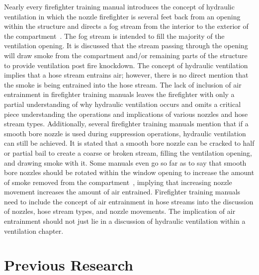 \documentclass[12pt,oneside]{book}
\begin{document}
Nearly every firefighter training manual introduces the concept of hydraulic ventilation in which the nozzle firefighter is several feet back from an opening within the structure and directs a fog stream from the interior to the exterior of the compartment~\cite{Essentials6,FEHandbook}. The fog stream is intended to fill the majority of the ventilation opening. It is discussed that the stream passing through the opening will draw smoke from the compartment and/or remaining parts of the structure to provide ventilation post fire knockdown. The concept of hydraulic ventilation implies that a hose stream entrains air; however, there is no direct mention that the smoke is being entrained into the hose stream. The lack of inclusion of air entrainment in firefighter training manuals leaves the firefighter with only a partial understanding of why hydraulic ventilation occurs and omits a critical piece understanding the operations and implications of various nozzles and hose stream types. Additionally, several firefighter training manuals mention that if a smooth bore nozzle is used during suppression operations, hydraulic ventilation can still be achieved. It is stated that a smooth bore nozzle can be cracked to half or partial bail to create a coarse or broken stream, filling the ventilation opening, and drawing smoke with it. Some manuals even go so far as to say that smooth bore nozzles should be rotated within the window opening to increase the amount of smoke removed from the compartment~\cite{FEHandbook}, implying that increasing nozzle movement increases the amount of air entrained. Firefighter training manuals need to include the concept of air entrainment in hose streams into the discussion of nozzles, hose stream types, and nozzle movements. The implication of air entrainment should not just lie in a discussion of hydraulic ventilation within a ventilation chapter.

\section*{Previous Research}
\end{document}
